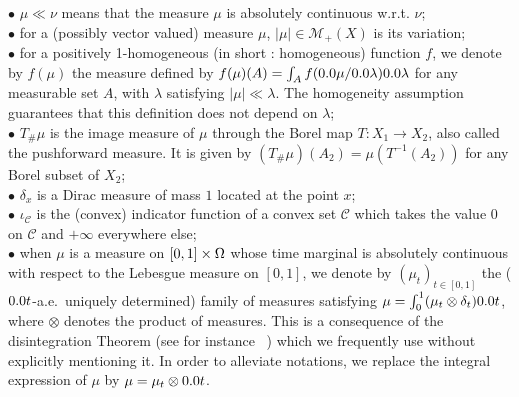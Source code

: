 \indent$\bullet$ $\mu \ll \nu$ means that the measure $\mu$ is absolutely continuous w.r.t. $\nu$;
\\
\indent$\bullet$ for a (possibly vector valued) measure $\mu$, $|\mu| \in \mathcal{M}_+(X)$ is its variation;
\\
\indent$\bullet$ for a positively 1-homogeneous (in short : homogeneous) function $f$, we denote by $f(\mu)$ the measure defined by $f(\mu)(A) = \int_A f(\d\mu/\d\lambda) \d\lambda$ for any measurable set $A$, with $\lambda$ satisfying $|\mu| \ll \lambda$. The homogeneity assumption guarantees that this definition does not depend on $\lambda$;
\\
\indent$\bullet$ $T_{\#} \mu$ is the image measure of $\mu$ through the Borel map $T: X_1 \to X_2$, also called the pushforward measure. It is given by $(T_{\#} \mu) (A_2) = \mu(T^{-1}(A_2))$ for any Borel subset of $X_2$;
\\
\indent$\bullet$ $\delta_x$ is a Dirac measure of mass $1$ located at the point $x$;
\\
\indent$\bullet$ $\iota_{\mathcal{C}}$ is the (convex) indicator function of a convex set $\mathcal{C}$ which takes the value $0$ on $\mathcal{C}$ and $+\infty$ everywhere else;
\\
\indent$\bullet$ when $\mu$ is a measure on $[0,1] \times \Omega$ whose time marginal is absolutely continuous with respect to the Lebesgue measure on $[0,1]$, we denote by $(\mu_t)_{t\in[0,1]}$ the ($\d t$-a.e.\ uniquely determined) family of measures satisfying $\mu = \int_0^1 (\mu_t \otimes \delta_t ) \d t$, where $\otimes$ denotes the product of measures. This is a consequence of the disintegration Theorem (see for instance ~\cite[Theorem 5.3.1]{ambrosio2006gradient}) which we frequently use without explicitly mentioning it. In order to alleviate notations, we replace the integral expression of $\mu$ by $\mu = \mu_t \otimes \d t$.

